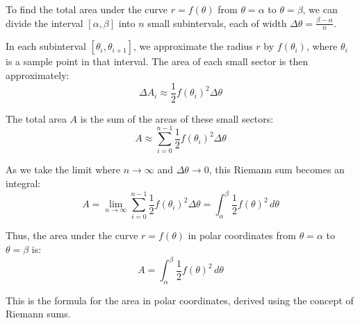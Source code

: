 \documentclass{report}
\begin{document}
To find the total area under the curve \( r = f(\theta) \) from \( \theta = \alpha \) to \( \theta = \beta \), we can divide the interval \( [\alpha, \beta] \) into \( n \) small subintervals, each of width \( \Delta \theta = \frac{\beta - \alpha}{n} \).

In each subinterval \( [ \theta_i, \theta_{i+1} ] \), we approximate the radius \( r \) by \( f(\theta_i) \), where \( \theta_i \) is a sample point in that interval. The area of each small sector is then approximately:
\[
	\Delta A_i \approx \frac{1}{2} f(\theta_i)^2 \Delta \theta
\]

The total area \( A \) is the sum of the areas of these small sectors:
\[
	A \approx \sum_{i=0}^{n-1} \frac{1}{2} f(\theta_i)^2 \Delta \theta
\]

As we take the limit where \( n \to \infty \) and \( \Delta \theta \to 0 \), this Riemann sum becomes an integral:
\[
	A = \lim_{n \to \infty} \sum_{i=0}^{n-1} \frac{1}{2} f(\theta_i)^2 \Delta \theta = \int_{\alpha}^{\beta} \frac{1}{2} f(\theta)^2 \, d\theta
\]

Thus, the area under the curve \( r = f(\theta) \) in polar coordinates from \( \theta = \alpha \) to \( \theta = \beta \) is:
\[
	\boxed{A = \int_{\alpha}^{\beta} \frac{1}{2} f(\theta)^2 \, d\theta}
\]

This is the formula for the area in polar coordinates, derived using the concept of Riemann sums.

\end{document}
